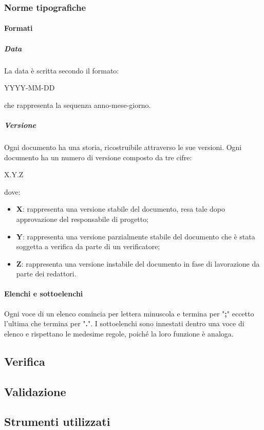 		\subsubsection{Norme tipografiche}
			\paragraph{Formati}
			\subparagraph{Data}
			La data è scritta secondo il formato:\newline
			\centerline{YYYY-MM-DD}\newline
			che rappresenta la sequenza anno-mese-giorno.
			\subparagraph{Versione}
			Ogni documento ha una storia, ricostruibile attraverso le sue versioni. Ogni documento ha un numero di versione composto da tre cifre:
			\begin{center}
				X.Y.Z
			\end{center}
			dove:
			\begin{itemize}
				\item \textbf{X}: rappresenta una versione stabile del documento, resa tale dopo approvazione del responsabile di progetto;
				\item \textbf{Y}: rappresenta una versione parzialmente stabile del documento che è stata soggetta a verifica da parte di un verificatore;
				\item \textbf{Z}: rappresenta una versione instabile del documento in fase di lavorazione da parte dei redattori.
			\end{itemize}
			\paragraph{Elenchi e sottoelenchi}
			Ogni voce di un elenco comincia per lettera minuscola e termina per "\textbf{;}" eccetto l'ultima che termina per "\textbf{.}". I sottoelenchi sono innestati dentro una voce di elenco e rispettano le medesime regole, poiché la loro funzione è analoga.
	\subsection{Verifica}
	\subsection{Validazione}
	\subsection{Strumenti utilizzati}
	
